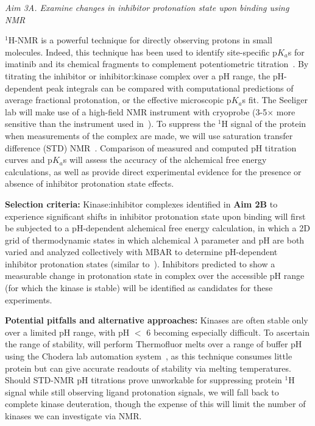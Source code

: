 \documentclass[11pt]{article}
\begin{document}
\eject

\emph{Aim 3A. Examine changes in inhibitor protonation state upon binding using NMR}

$^1$H-NMR is a powerful technique for directly observing protons in small molecules.	
Indeed, this technique has been used to identify site-specific p$K_a$s for imatinib and its chemical fragments to complement potentiometric titration~\cite{szakacks:j-med-chem:2005:acid-base-profiling-of-imatinib}.
By titrating the inhibitor or inhibitor:kinase complex over a pH range, the pH-dependent peak integrals can be compared with computational predictions of average fractional protonation, or the effective microscopic p$K_a$s fit.
The Seeliger lab will make use of a high-field NMR instrument with cryoprobe (3-5$\times$ more sensitive than the instrument used in~\cite{szakacks:j-med-chem:2005:acid-base-profiling-of-imatinib}).
To suppress the $^1$H signal of the protein when measurements of the complex are made, we will use saturation transfer difference (STD) NMR~\cite{meyer-peters:angew-chem:2003:std-nmr}.
Comparison of measured and computed pH titration curves and p$K_a$s will assess the accuracy of the alchemical free energy calculations, as well as provide direct experimental evidence for the presence or absence of inhibitor protonation state effects.

{\bf Selection criteria:}
Kinase:inhibitor complexes identified in {\bf Aim 2B} to experience significant shifts in inhibitor protonation state upon binding will first be subjected to a pH-dependent alchemical free energy calculation, in which a 2D grid of thermodynamic states in which alchemical $\lambda$ parameter and pH are both varied and analyzed collectively with MBAR to determine pH-dependent inhibitor protonation states (similar to~\cite{dashi-meng-roitberg:jpcb:2012:ph-remd}).
Inhibitors predicted to show a measurable change in protonation state in complex over the accessible pH range (for which the kinase is stable) will be identified as candidates for these experiments.

{\bf Potential pitfalls and alternative approaches:} 
Kinases are often stable only over a limited pH range, with pH $<$ 6 becoming especially difficult.
To ascertain the range of stability, will perform Thermofluor melts over a range of buffer pH using the Chodera lab automation system~\cite{magliery:jacs:2009:thermofluor}, as this technique consumes little protein but can give accurate readouts of stability via melting temperatures.
Should STD-NMR pH titrations prove unworkable for suppressing protein $^1$H signal while still observing ligand protonation signals, we will fall back to complete kinase deuteration, though the expense of this will limit the number of kinases we can investigate via NMR.
\end{document}
